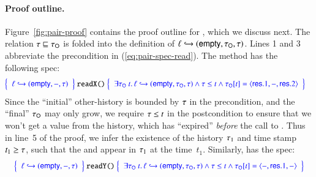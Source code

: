 \paragraph{Proof outline.}
Figure~\ref{fig:pair-proof} contains the proof outline for
, which we discuss next. The relation $\tau \sqsubseteq
\tau_{\mathsf{O}}$ is folded into the definition of ${\ell} \hookrightarrow ({\mathsf{empty},
  \tau_{\mathsf{O}}, \tau})$. Lines 1 and 3 abbreviate the precondition in
(\ref{eq:pair-spec-read}). The  method has the following
spec:
%
%
\[
{\small
\hspace{-3.5mm}
\begin{array}{r@{\ }c@{\ }l}
\spec{
  \begin{array}{l}
    \histso{\hps}{\hempty, -, \hist}
  \end{array}
} &\Cmd{readX}{} & 
\spec{ 
  \begin{array}{l}
    \exists \histO\ t\ldot \histso{\hps}{\hempty, \histO, \hist} \aand \hist \le t \aand  \inat{\angled{\res.1, -, \res.2}}{\histO}{t}
  \end{array}
}
\end{array}
}
\]
%
Since the ``initial'' other-history is bounded by $\tau$ in the
precondition, and the ``final'' $\tau_{\mathsf{O}}$ may only grow, we require
$\tau \le t$ in the postcondition to ensure that we won't get a value
from the history, which has ``expired'' \emph{before} the call to
.
%
Thus in line~5 of the proof, we infer the existence of the
history $\tau_1$ and time stamp $t_1 \geq \tau$, such that the
 and  appear in $\tau_1$ at the time~$t_1$. 
%
Similarly,  has the spec:
\[
{\small
\begin{array}{r@{\ }c@{\ }l}
\spec{
  \begin{array}{l}
    \histso{\hps}{\hempty, -, \hist}
  \end{array}
} & \Cmd{readY}{} & 
\spec{ 
  \begin{array}{l}
    \exists \histO\ t\ldot \histso{\hps}{\hempty, \histO, \hist} \aand \hist \le t \aand \inat{\angled{-, \res.1, -}}{\histO}{t}
  \end{array}
}
\end{array}
}
\]
%

